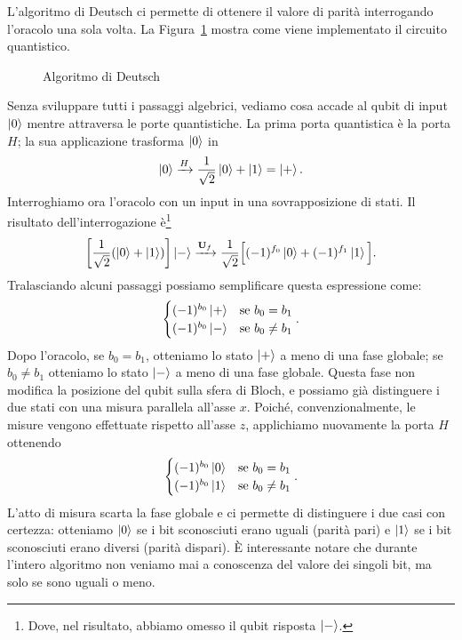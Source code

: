 L'algoritmo di Deutsch ci permette di ottenere il valore di parità interrogando l'oracolo una sola volta. La Figura~\ref{fig:deutsch} mostra come viene implementato il circuito quantistico.
\begin{figure}[h]
	\centering
	\vspace{-.1cm}
	\caption{Algoritmo di Deutsch}
	\label{fig:deutsch}
\end{figure}

Senza sviluppare tutti i passaggi algebrici, vediamo cosa accade al qubit di input $\Ket{0}$ mentre attraversa le porte quantistiche. La prima porta quantistica è la porta $H$; la sua applicazione trasforma $\Ket{0}$ in
\[
\Ket{0} \xrightarrow{H} \frac{1}{\sqrt{2}}\Ket{0} + \Ket{1} = \Ket{+}.
\]
Interroghiamo ora l'oracolo con un input in una sovrapposizione di stati. Il risultato dell'interrogazione è\footnote{Dove, nel risultato, abbiamo omesso il qubit risposta $\Ket{-}$.}
\[
\left[\frac{1}{\sqrt{2}}(\Ket{0} + \Ket{1})\right] \Ket{-} \xrightarrow{\mathbf{U}_f} \frac{1}{\sqrt{2}}\Big[(-1)^{f_0}\Ket{0} + (-1)^{f_1}\Ket{1}\Big].
\]
Tralasciando alcuni passaggi possiamo semplificare questa espressione come:
\[
\begin{cases}
	(-1)^{b_0} \Ket{+} & \text{se } b_0=b_1\\
	(-1)^{b_0} \Ket{-} & \text{se } b_0\neq b_1
\end{cases}.
\]
Dopo l'oracolo, se $b_0=b_1$, otteniamo lo stato $\Ket{+}$ a meno di una fase globale; se $b_0\neq b_1$ otteniamo lo stato $\Ket{-}$ a meno di una fase globale. Questa fase non modifica la posizione del qubit sulla sfera di Bloch, e possiamo già distinguere i due stati con una misura parallela all'asse $x$. Poiché, convenzionalmente, le misure vengono effettuate rispetto all'asse $z$, applichiamo nuovamente la porta $H$ ottenendo
\[
\begin{cases}
	(-1)^{b_0} \Ket{0} & \text{se } b_0=b_1\\
	(-1)^{b_0} \Ket{1} & \text{se } b_0\neq b_1
\end{cases}.
\]
L'atto di misura scarta la fase globale e ci permette di distinguere i due casi con certezza: otteniamo $\Ket{0}$ se i bit sconosciuti erano uguali (parità pari) e $\Ket{1}$ se i bit sconosciuti erano diversi (parità dispari). È interessante notare che durante l'intero algoritmo non veniamo mai a conoscenza del valore dei singoli bit, ma solo se sono uguali o meno.

